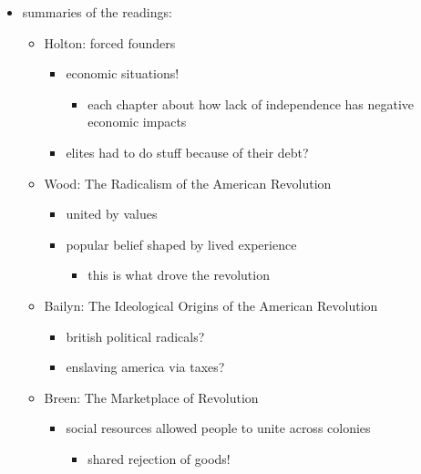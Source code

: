 \documentclass[letterpaper]{article}
\begin{document}
\begin{itemize}
\item summaries of the readings:

\begin{itemize}
\item Holton: forced founders

\begin{itemize}
\item economic situations!

\begin{itemize}
\item each chapter about how lack of independence has negative
economic impacts
\end{itemize}

\item elites had to do stuff because of their debt?
\end{itemize}

\item Wood: The Radicalism of the American Revolution

\begin{itemize}
\item united by values
\item popular belief shaped by lived experience

\begin{itemize}
\item this is what drove the revolution
\end{itemize}
\end{itemize}

\item Bailyn: The Ideological Origins of the American Revolution

\begin{itemize}
\item british political radicals?
\item enslaving america via taxes?
\end{itemize}

\item Breen: The Marketplace of Revolution

\begin{itemize}
\item social resources allowed people to unite across colonies

\begin{itemize}
\item shared rejection of goods!
\end{itemize}
\end{itemize}


\end{itemize}
\end{itemize}
\end{document}
